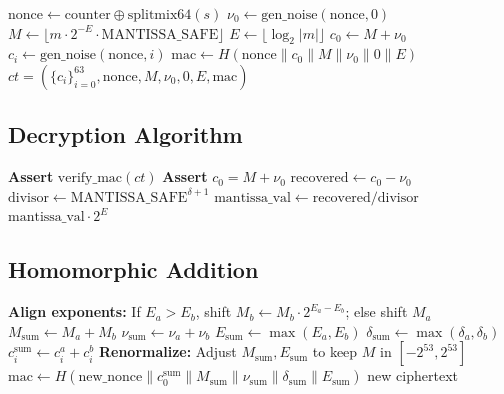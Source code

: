 \documentclass[11pt,a4paper]{article}
\DeclareMathOperator{\Enc}{Enc}
\DeclareMathOperator{\Dec}{Dec}
\DeclareMathOperator{\Add}{Add}
\begin{document}
\begin{algorithm}[H]
\caption{$\Enc(m, s)$}
\label{alg:encrypt}
\begin{algorithmic}[1]
\State $\text{nonce} \gets \text{counter} \oplus \text{splitmix64}(s)$
\State $\nu_0 \gets \text{gen\_noise}(\text{nonce}, 0)$ 
\State $M \gets \lfloor m \cdot 2^{-E} \cdot \text{MANTISSA\_SAFE} \rfloor$ 
\State $E \gets \lfloor\log_2|m|\rfloor$ 
\State $c_0 \gets M + \nu_0$
    \State $c_i \gets \text{gen\_noise}(\text{nonce}, i)$
\EndFor
\State $\text{mac} \gets H(\text{nonce} \| c_0 \| M \| \nu_0 \| 0 \| E)$ 
\State \Return $ct = (\{c_i\}_{i=0}^{63}, \text{nonce}, M, \nu_0, 0, E, \text{mac})$
\end{algorithmic}
\end{algorithm}

\subsection{Decryption Algorithm}

\begin{algorithm}[H]
\caption{$\Dec(ct, s)$}
\label{alg:decrypt}
\begin{algorithmic}[1]
\State \textbf{Assert} $\text{verify\_mac}(ct)$ 
\State \textbf{Assert} $c_0 = M + \nu_0$ 
\State $\text{recovered} \gets c_0 - \nu_0$ 
\State $\text{divisor} \gets \text{MANTISSA\_SAFE}^{\delta+1}$ 
\State $\text{mantissa\_val} \gets \text{recovered} / \text{divisor}$
\State \Return $\text{mantissa\_val} \cdot 2^{E}$ 
\end{algorithmic}
\end{algorithm}

\subsection{Homomorphic Addition}

\begin{algorithm}[H]
\caption{$\Add(ct_a, ct_b)$}
\label{alg:add}
\begin{algorithmic}[1]
\State \textbf{Align exponents:} If $E_a > E_b$, shift $M_b \gets M_b \cdot 2^{E_a-E_b}$; else shift $M_a$
\State $M_{\text{sum}} \gets M_a + M_b$
\State $\nu_{\text{sum}} \gets \nu_a + \nu_b$
\State $E_{\text{sum}} \gets \max(E_a, E_b)$
\State $\delta_{\text{sum}} \gets \max(\delta_a, \delta_b)$
    \State $c_i^{\text{sum}} \gets c_i^a + c_i^b$
\EndFor
\State \textbf{Renormalize:} Adjust $M_{\text{sum}}, E_{\text{sum}}$ to keep $M$ in $[-2^{53}, 2^{53}]$
\State $\text{mac} \gets H(\text{new\_nonce} \| c_0^{\text{sum}} \| M_{\text{sum}} \| \nu_{\text{sum}} \| \delta_{\text{sum}} \| E_{\text{sum}})$
\State \Return new ciphertext
\end{algorithmic}
\end{algorithm}
\end{document}
